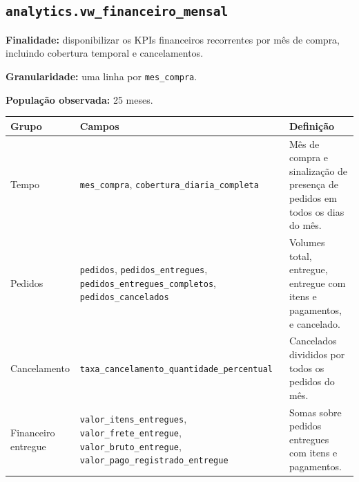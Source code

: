 \documentclass[12pt,a4paper]{article}
\newcounter{none}
\begin{document}
\subsection{\texorpdfstring{\nolinkurl{analytics.vw_financeiro_mensal}}{}}\label{docs__analytics__estruturas_schema_analytics.md__analytics.vw_financeiro_mensal}

\textbf{Finalidade:} disponibilizar os KPIs financeiros recorrentes por
mês de compra, incluindo cobertura temporal e cancelamentos.

\textbf{Granularidade:} uma linha por \nolinkurl{mes_compra}.

\textbf{População observada:} 25 meses.

{\def\LTcaptype{none} %
\begin{longtable}[]{@{}
  >{\raggedright\arraybackslash}p{}
  >{\raggedright\arraybackslash}p{}
  >{\raggedright\arraybackslash}p{}@{}}
\toprule\noalign{}
\rowcolor{AzulCorporativo}
\begin{minipage}[b]{\linewidth}\raggedright\color{white}\bfseries
Grupo
\end{minipage} & \begin{minipage}[b]{\linewidth}\raggedright\color{white}\bfseries
Campos
\end{minipage} & \begin{minipage}[b]{\linewidth}\raggedright\color{white}\bfseries
Definição
\end{minipage} \\
\midrule\noalign{}
\endhead
\bottomrule\noalign{}
\endlastfoot
Tempo & \nolinkurl{mes_compra}, \nolinkurl{cobertura_diaria_completa} &
Mês de compra e sinalização de presença de pedidos em todos os dias do
mês. \\
Pedidos & \nolinkurl{pedidos}, \nolinkurl{pedidos_entregues},
\nolinkurl{pedidos_entregues_completos}, \nolinkurl{pedidos_cancelados}
& Volumes total, entregue, entregue com itens e pagamentos, e
cancelado. \\
Cancelamento & \nolinkurl{taxa_cancelamento_quantidade_percentual} &
Cancelados divididos por todos os pedidos do mês. \\
Financeiro entregue & \nolinkurl{valor_itens_entregues},
\nolinkurl{valor_frete_entregue}, \nolinkurl{valor_bruto_entregue},
\nolinkurl{valor_pago_registrado_entregue} & Somas sobre pedidos
entregues com itens e pagamentos. \\

\end{longtable}}
\end{document}
